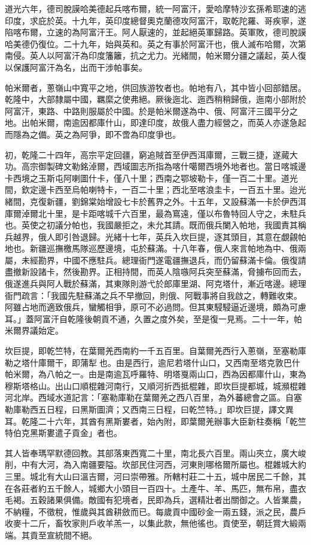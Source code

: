 \begin{pinyinscope}
道光六年，德司脫謨哈美德起兵喀布爾，統一阿富汗，愛哈摩特沙玄孫希耶速的逃印度，求庇於英。十九年，英印度總督奧克蘭德攻阿富汗，取乾陀羅、哥疾寧，遂陷喀布爾，立速的為阿富汗王。阿人厭速的，並起絕英軍歸路。英軍敗，德司脫謨哈美德仍復位。二十九年，始與英和。英之有事於阿富汗也，俄人滅布哈爾，次第南侵。英人以阿富汗為印度籓籬，抗之尤力。光緒間，帕米爾分疆之議起，英人復以保護阿富汗為名，出而干涉帕事矣。

帕米爾者，蔥嶺山中寬平之地，供回族游牧者也。帕地有八，其中皆小回部錯居。乾隆中，大部隸屬中國，羈縻之使弗絕。厥後迤北、迤西稍稍歸俄，迤南小部附於阿富汗，東路、中路則服屬於中國。於是帕米爾遂為中、俄、阿富汗三國平分之地。出帕米爾，南逾因都庫什山，即達印度，故俄人盡力經營之，而英人亦遂急起而隱為之備。英之為阿爭，即不啻為印度爭也。

初，乾隆二十四年，高宗平定回疆，窮追賊首至伊西洱庫爾，三戰三捷，遂蕆大功。高宗御製碑文勒銘淖爾，西域圖志所指為喀什噶爾西境外地者也。當日喀城邊卡西境之玉斯屯阿喇圖什卡，僅八十里；西南之鄂坡勒卡，僅一百二十里。道光間，欽定邊卡西至烏帕喇特卡，一百二十里；西北至喀浪圭卡，一百五十里。迨光緒間，克復新疆，劉錦棠始增設七卡於舊界之外。十五年，又設蘇滿一卡於伊西洱庫爾淖爾北十里，是卡距喀城千六百里，最為窵遠，僅以布魯特回人守之，未駐兵也。英使之初議分帕也，我國嚴拒之，未允其請。既而俄兵闌入帕地，我國責其稱兵越界，俄人即引咎退歸。光緒十七年，英兵入坎巨提，逐其頭目，其意在覷覦帕地也。新疆巡撫檄馬隊巡歷邊境，屯於蘇滿。十八年春，俄人來言帕地為中、俄兩屬，未經勘界，中國不應駐兵。總理衙門遂電疆撫退兵，而仍留蘇滿卡倫。俄復請盡撤新設諸卡，然後勘界。正相持間，而英人陰嗾阿兵突至蘇滿，脅擄布回而去，俄遂進兵與阿人戰於蘇滿，其東隊則游弋於郎庫里湖、阿克塔什，漸近喀邊。總理衙門疏言：「我國先駐蘇滿之兵不早撤回，則俄、阿戰事將自我啟之，轉難收束。阿雖占地而適致俄兵，蠻觸相爭，原可不必過問。但其東駸駸逼近邊境，頗為可慮耳。」蓋阿富汗自乾隆後朝貢不通，久置之度外矣，至是復一見焉。二十一年，帕米爾界議始定。

坎巨提，即乾竺特，在葉爾羌西南約一千五百里。自葉爾羌西行入蔥嶺，至塞勒庫勒之塔什庫爾干，即蒲犁也。由是西行，逾尼若塔什山口，又西南至塔克敦巴什帕米爾，為八帕之一。由是南逾瓦呼羅特、明塔戛兩山口，西為因都庫什山，東為穆斯塔格山。出山口順棍雜河南行，又順河折西抵棍雜，即坎巨提都城，城瀕棍雜河北岸。西域水道記言：「塞勒庫勒在葉爾羌之西八百里，為外蕃總會之區。自塞勒庫勒西五日程，曰黑斯圖濟；又西南三日程，曰乾竺特。」即坎巨提，譯文異耳。乾隆二十六年，其酋有黑斯婁者，始內附，即葉爾羌辦事大臣新柱奏稱「乾竺特伯克黑斯婁遣子貢金」者也。

其人皆奉瑪罕默德回教。其部落東西寬二十里，南北長六百里。兩山夾立，廣大峻削，中有大河，為入南疆要隘。坎部民住河西，河東則哪格爾所屬也。棍雜城大約三里。城北有大山曰溫吉爾，河曰崇帶雅。所轄村莊二十五，城中居民二千餘，其在各莊者約五千餘人，城鄉大小頭目一百四十。土產牛、羊、馬匹，無布帛，盡衣毛褐。五穀諸果俱備。敵國有犯境者，民即為兵，選精壯者出關御之。人皆業農，不納糧，不徵稅，惟歲與其酋耕斂而已。每歲貢中國砂金一兩五錢，派之民，農戶收麥十二斤，畜牧家則戶收羊羔一，以集此款，無他徭也。貢使至，朝廷賞大緞兩端。其貢至宣統間不絕。


\end{pinyinscope}
